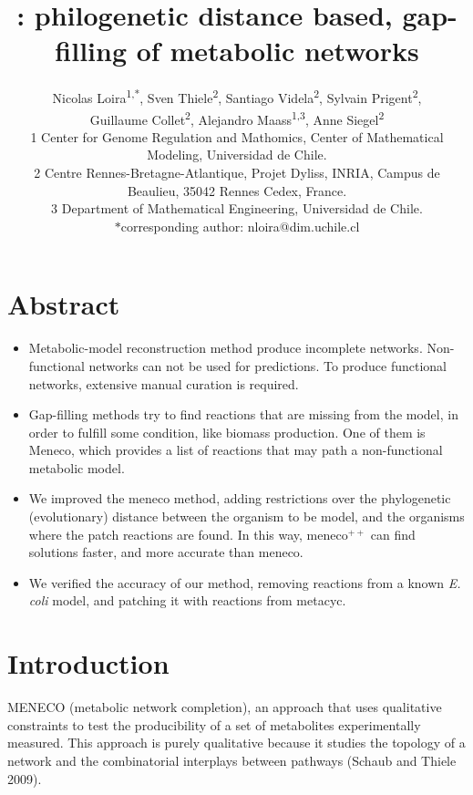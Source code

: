 \documentclass{article}
\title{\Meneco: philogenetic distance based, gap-filling of metabolic networks}
\author{Nicolas Loira\textsuperscript{1,*},
Sven Thiele\textsuperscript{2},
Santiago Videla\textsuperscript{2},
Sylvain Prigent\textsuperscript{2},\\
Guillaume Collet\textsuperscript{2},
Alejandro Maass\textsuperscript{1,3},
Anne Siegel\textsuperscript{2}\\
{\scriptsize 1 Center for Genome Regulation and Mathomics, Center of Mathematical Modeling, Universidad de Chile.}\\
{\scriptsize 2 Centre Rennes-Bretagne-Atlantique, Projet Dyliss, INRIA, Campus de Beaulieu, 35042 Rennes Cedex, France.}\\
{\scriptsize 3 Department of Mathematical Engineering, Universidad de Chile.} \\
{\scriptsize $*$corresponding author: nloira@dim.uchile.cl}
}
\newcommand{\meneco}{meneco$^{++}$\xspace}
\begin{document}
\maketitle

\section{Abstract}

\begin{itemize}
	\item Metabolic-model reconstruction method produce incomplete networks. Non-functional networks can not be used for predictions. To produce functional networks, extensive manual curation is required.
	\item Gap-filling methods try to find reactions that are missing from the model, in order to fulfill some condition, like biomass production. One of them is Meneco, which provides a list of reactions that may path a non-functional metabolic model.
	\item We improved the meneco method, adding restrictions over the phylogenetic (evolutionary) distance between the organism to be model, and the organisms where the patch reactions are found. In this way, \meneco can find solutions faster, and more accurate than meneco.
	\item We verified the accuracy of our method, removing reactions from a known \emph{E. coli} model, and patching it with reactions from metacyc. 
\end{itemize}



\section{Introduction}

MENECO (metabolic network completion), an approach that uses qualitative constraints to test the producibility of a set of metabolites experimentally measured. This approach is purely qualitative because it studies the topology of a network and the combinatorial interplays between pathways (Schaub and Thiele 2009).
\end{document}
